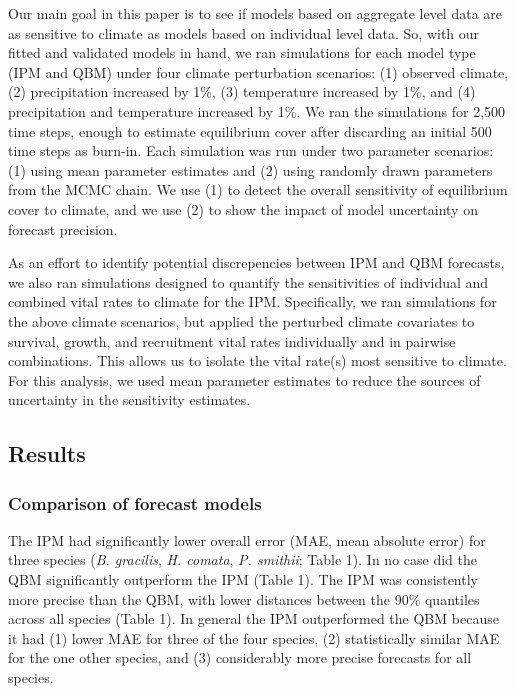\documentclass[12pt,]{article}
\begin{document}
Our main goal in this paper is to see if models based on aggregate level
data are as sensitive to climate as models based on individual level
data. So, with our fitted and validated models in hand, we ran
simulations for each model type (IPM and QBM) under four climate
perturbation scenarios: (1) observed climate, (2) precipitation
increased by 1\%, (3) temperature increased by 1\%, and (4)
precipitation and temperature increased by 1\%. We ran the simulations
for 2,500 time steps, enough to estimate equilibrium cover after
discarding an initial 500 time steps as burn-in. Each simulation was run
under two parameter scenarios: (1) using mean parameter estimates and
(2) using randomly drawn parameters from the MCMC chain. We use (1) to
detect the overall sensitivity of equilibrium cover to climate, and we
use (2) to show the impact of model uncertainty on forecast precision.

As an effort to identify potential discrepencies between IPM and QBM
forecasts, we also ran simulations designed to quantify the
sensitivities of individual and combined vital rates to climate for the
IPM. Specifically, we ran simulations for the above climate scenarios,
but applied the perturbed climate covariates to survival, growth, and
recruitment vital rates individually and in pairwise combinations. This
allows us to isolate the vital rate(s) most sensitive to climate. For
this analysis, we used mean parameter estimates to reduce the sources of
uncertainty in the sensitivity estimates.

\subsection{Results}\label{results}

\subsubsection{Comparison of forecast
models}\label{comparison-of-forecast-models}

The IPM had significantly lower overall error (MAE, mean absolute error)
for three species (\emph{B. gracilis}, \emph{H. comata}, \emph{P.
smithii}; Table 1). In no case did the QBM significantly outperform the
IPM (Table 1). The IPM was consistently more precise than the QBM, with
lower distances between the 90\% quantiles across all species (Table 1).
In general the IPM outperformed the QBM because it had (1) lower MAE for
three of the four species, (2) statistically similar MAE for the one
other species, and (3) considerably more precise forecasts for all
species.
\end{document}
